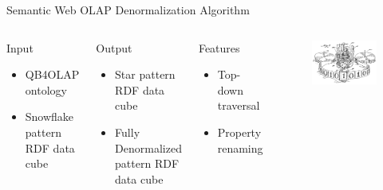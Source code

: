 \begin{frame}{Semantic Web OLAP Denormalization Algorithm}
\begin{columns}
    \begin{block}{Input}
        \begin{itemize}
            \item QB4OLAP ontology
            \item Snowflake pattern RDF data cube
        \end{itemize}
    \end{block}

    \begin{block}{Output}
        \begin{itemize}
            \item Star pattern RDF data cube
            \item Fully Denormalized pattern RDF data cube
        \end{itemize}
    \end{block}

    \begin{block}{Features}
        \begin{itemize}
            \item Top-down traversal
            \item Property renaming
        \end{itemize}
    \end{block}

    
    \begin{figure}
        \includegraphics[width=\textwidth]{images/turingMachine.png}
    \end{figure}    
\end{columns}
\end{frame}



